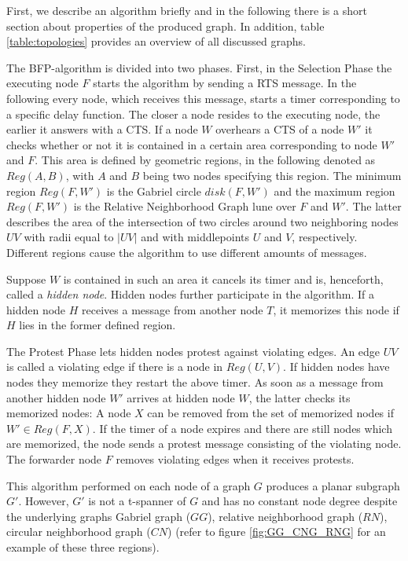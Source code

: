 First, we describe an algorithm briefly and in the following there is a short section about properties of the produced graph.
In addition, table \ref{table:topologies} provides an overview of all discussed graphs.

The BFP-algorithm \cite{Ruhrup2010} is divided into two phases.
First, in the Selection Phase the executing node $F $ starts the algorithm by sending a RTS message. 
In the following every node, which receives this message, starts a timer corresponding to a specific delay function.
The closer a node resides to the executing node, the earlier it answers with a CTS. 
If a node $W $ overhears a CTS of a node $W' $ it checks whether or not it is contained in a certain area corresponding to node $W' $ and $F $.
This area is defined by geometric regions, in the following denoted as $Reg(A, B) $, with $A $ and $B $ being two nodes specifying this region.
The minimum region $Reg(F, W') $ is the Gabriel circle $disk(F, W') $ and the maximum region $Reg(F, W') $ is the Relative Neighborhood Graph lune over $F $ and $W' $.
The latter describes the area of the intersection of two circles around two neighboring nodes $UV $ with radii equal to $|UV| $ and with middlepoints $U $ and $V $, respectively.
Different regions cause the algorithm to use different amounts of messages.

Suppose $W $ is contained in such an area it cancels its timer and is, henceforth, called a \emph{hidden node}.
Hidden nodes further participate in the algorithm.
If a hidden node $H $ receives a message from another node $T $, it memorizes this node if $H $ lies in the former defined region. 

The Protest Phase lets hidden nodes protest against violating edges.
An edge $UV $ is called a violating edge if there is a node in $Reg(U, V) $.
If hidden nodes have nodes they memorize they restart the above timer.
As soon as a message from another hidden node $W' $ arrives at hidden node $W $, the latter checks its memorized nodes:
A node $X $ can be removed from the set of memorized nodes if $W' \in Reg(F,X) $.
If the timer of a node expires and there are still nodes which are memorized, the node sends a protest message consisting of the violating node.
The forwarder node $F $ removes violating edges when it receives protests.

This algorithm performed on each node of a graph $G $ produces a planar subgraph $G' $.
However, $G' $ is not a t-spanner of $G $ and has no constant node degree despite the underlying graphs Gabriel graph ($GG $), relative neighborhood graph ($RN $), circular neighborhood graph ($CN$) (refer to figure \ref{fig:GG_CNG_RNG} for an example of these three regions).


